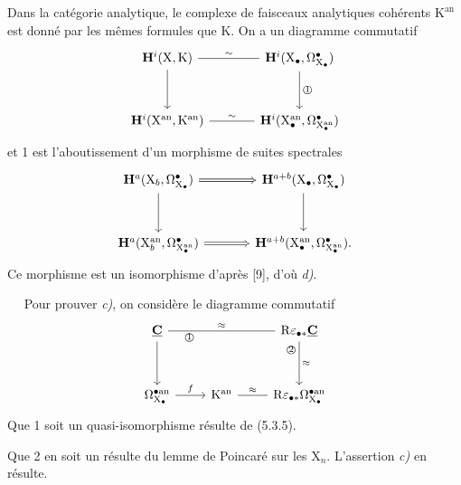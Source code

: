 \documentclass[11pt,leqno]{article}
\newcommand{\Page}[1]{\ifvmode\noindent\else\unskip\ \fi{\footnotesize\textcolor{gray}{[p.\,#1]}}\ \ignorespaces}
\begin{document}
Dans la catégorie analytique, le complexe de faisceaux analytiques cohérents \(\mathrm{K}^{\mathrm{an}}\) est donné par les mêmes formules que \(\mathrm{K}\). On a un diagramme commutatif
\[
\begin{tikzcd}[ampersand replacement=\&, column sep=large, row sep=3em]
\mathbf{H}^{i}(\mathrm{X},\mathrm{K})
  \arrow[r, dash, "\sim"]\arrow[d]
\&
\mathbf{H}^{i}(\mathrm{X}_{\bullet},\Omega_{\mathrm{X}_{\bullet}}^{\bullet})
  \arrow[d, "\text{\textcircled{1}}"]
\\
\mathbf{H}^{i}(\mathrm{X}^{\mathrm{an}},\mathrm{K}^{\mathrm{an}})
  \arrow[r, dash, "\sim"]
\&
\mathbf{H}^{i}(\mathrm{X}_{\bullet}^{\mathrm{an}},
              \Omega_{\mathrm{X}_{\bullet}^{\mathrm{an}}}^{\bullet})
\end{tikzcd}
\]
et 1 est l’aboutissement d’un morphisme de suites spectrales
\[
\begin{tikzcd}[ampersand replacement=\&, column sep=large, row sep=3em]
\mathbf{H}^{a}(\mathrm{X}_{b},\Omega_{\mathrm{X}_{\bullet}}^{\bullet})
  \arrow[r, Rightarrow]\arrow[d]
\&
\mathbf{H}^{a+b}(\mathrm{X}_{\bullet},\Omega_{\mathrm{X}_{\bullet}}^{\bullet})
  \arrow[d]
\\
\mathbf{H}^{a}(\mathrm{X}_{b}^{\mathrm{an}},
              \Omega_{\mathrm{X}_{\bullet}^{\mathrm{an}}}^{\bullet})
  \arrow[r, Rightarrow]
\&
\mathbf{H}^{a+b}(\mathrm{X}_{\bullet}^{\mathrm{an}},
                \Omega_{\mathrm{X}_{\bullet}^{\mathrm{an}}}^{\bullet}).
\end{tikzcd}
\]
Ce morphisme est un isomorphisme d’après [9], d’où \textit{d)}.

\Page{53}
Pour prouver \textit{c)}, on considère le diagramme commutatif
\[
\begin{tikzcd}[column sep=2.4em, row sep=3.5em]
\underline{\mathbf{C}}
  \arrow[rr, dash, "\approx", "{\text{\textcircled{1}}}"'{pos=.2}]
  \arrow[d]
& &
\mathrm{R}\varepsilon_{\bullet *}\underline{\mathbf{C}}
  \arrow[d, "\approx", "{\text{\textcircled{2}}}"'{pos=.2}]
\\
\Omega_{\mathrm{X}_{\bullet}}^{\bullet\mathrm{an}}
  \arrow[r, "f"]
&
\mathrm{K}^{\mathrm{an}}
  \arrow[r, dash, "\approx"]
&
\mathrm{R}\varepsilon_{\bullet *}
  \Omega_{\mathrm{X}_{\bullet}}^{\bullet\mathrm{an}}
\end{tikzcd}
\]
Que 1 soit un quasi-isomorphisme résulte de (5.3.5).\par
Que 2 en soit un résulte du lemme de Poincaré sur les \(\mathrm{X}_n\).
L’assertion \textit{c)} en résulte.
\end{document}
